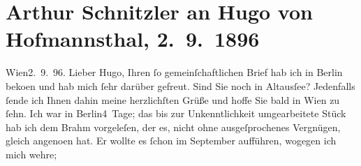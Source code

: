 

         
         \newcommand{\erwaehntePersonen}{Personen: Richard Beer-Hofmann, Otto Brahm, Hugo von Hofmannsthal, Hermine von Schaffgotsch}
         \newcommand{\erwaehnteOrte}{Orte: Altaussee, Berlin, München, Uppsala, Wien}
         \newcommand{\erwaehnteWerke}{Werke: Freiwild. Schauspiel in 3 Akten, Geschichte der beiden Liebespaare}
               \section[Arthur Schnitzler an Hugo von Hofmannsthal, 2. 9. 1896]{ Arthur Schnitzler an Hugo von Hofmannsthal,
                    2. 9. 1896}\nopagebreak{}\rehead{ }\begin{ledgroupsized}[t]{13cm}\normalsize\beginnumbering \toendnotes[C]{\smallbreak\pagebreak[2]} 
\toendnotes[C]{\smallbreak}\pstart
           \raggedleft{}{\pb}Wien2. 9. 96.\pend
           \pstart{}Lieber Hugo,\pend\pstart
           Ihren ſo gemeinſchaftlichen
                    Brief hab ich in Berlin beko{\geminationm}en und hab mich ſehr darüber gefreut. Sind Sie
                    noch in Altausſee? Jedenfalls ſende ich Ihnen
                    dahin meine herzlichſten Grüße und hoffe Sie bald in Wien zu ſehn. Ich war in Berlin4 Tage; das bis zur Unkenntlichkeit umgearbeitete
                        Stück hab ich dem Brahm vorgeleſen, der es, nicht ohne
                    ausgeſprochenes Vergnügen, gleich angeno{\geminationm}en hat. Er
                    wollte es ſchon im September aufführen, wogegen ich mich wehre;

\end{ledgroupsized}

